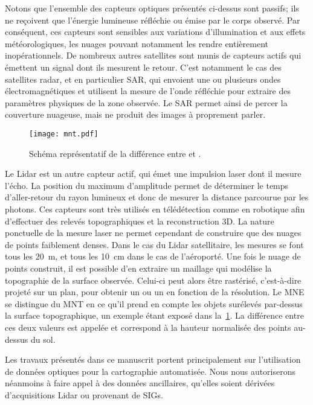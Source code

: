 Notons que l'ensemble des capteurs optiques présentés ci-dessus sont passifs; ils ne reçoivent que l'énergie lumineuse réfléchie ou émise par le corps observé. Par conséquent, ces capteurs sont sensibles aux variations d'illumination et aux effets météorologiques, les nuages pouvant notamment les rendre entièrement inopérationnels. De nombreux autres satellites sont munis de capteurs actifs qui émettent un signal dont ils mesurent le retour. C'est notamment le cas des satellites radar, et en particulier \gls{SAR}, qui envoient une ou plusieurs ondes électromagnétiques et utilisent la mesure de l'onde réfléchie pour extraire des paramètres physiques de la zone observée. Le \gls{SAR} permet ainsi de percer la couverture nuageuse, mais ne produit des images à proprement parler.

\begin{figure}
  \texttt{[image: mnt.pdf]}
  \caption{Schéma représentatif de la différence entre  et .}
  \label{fig:mnt}
\end{figure}

Le \gls{Lidar} est un autre capteur actif, qui émet une impulsion laser dont il mesure l'écho. La position du maximum d'amplitude permet de déterminer le temps d'aller-retour du rayon lumineux et donc de mesurer la distance parcourue par les photons. Ces capteurs sont très utilisés en télédétection comme en robotique afin d'effectuer des relevés topographiques et la reconstruction 3D. La nature ponctuelle de la mesure laser ne permet cependant de construire que des nuages de points faiblement denses. Dans le cas du \gls{Lidar} satellitaire, les mesures se font tous les \SI{20}{\meter}, et tous les \SI{10}{\centi\meter} dans le cas de l'aéroporté. Une fois le nuage de points construit, il est possible d'en extraire un maillage qui modélise la topographie de la surface observée. Celui-ci peut alors être rastérisé, c'est-à-dire projeté sur un plan, pour obtenir un  ou un  en fonction de la résolution. Le \gls{MNE} se distingue du \gls{MNT} en ce qu'il prend en compte les objets surélevés par-dessus la surface topographique, un exemple étant exposé dans la~\cref{fig:mnt}. La différence entre ces deux valeurs est appelée  et correspond à la hauteur normalisée des points au-dessus du sol.

Les travaux présentés dans ce manuscrit portent principalement sur l'utilisation de données optiques pour la cartographie automatisée. Nous nous autoriserons néanmoins à faire appel à des données ancillaires, qu'elles soient dérivées d'acquisitions \gls{Lidar} ou provenant de \glspl{SIG}.

